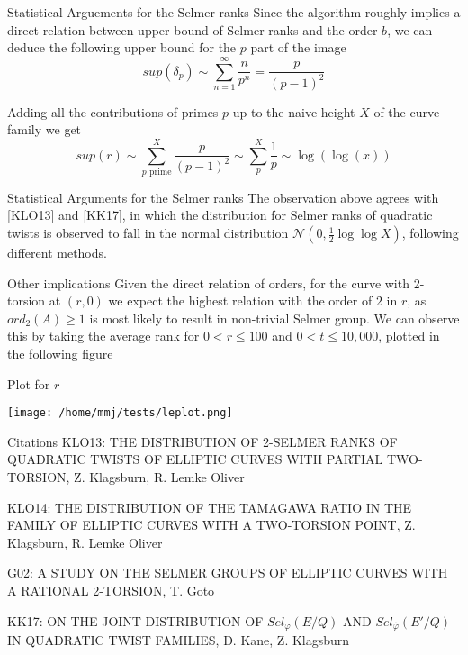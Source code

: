 \documentclass[presentation]{beamer}
\begin{document}
\begin{frame}[label={sec:org375f1cc}]{Statistical Arguements for the Selmer ranks}
Since the algorithm roughly implies a direct relation
between upper bound of Selmer ranks and the order \(b\), we can deduce the
following upper bound for the \(p\) part of the image
$$sup(\delta_p) \sim \sum_{n = 1}^\infty \frac{n}{p^{n}} = \frac{p}{(p-1)^2}$$

Adding all the contributions of primes \(p\) up to the naive height
\(X\) of the curve family we get
$$sup(r) \sim \sum_{p \text{ prime}}^X \frac{p}{(p-1)^2} \sim \sum_p^X \frac{1}{p} \sim \log(\log(x))$$
\end{frame}
\begin{frame}[label={sec:orge060821}]{Statistical Arguments for the Selmer ranks}
The observation above agrees with [KLO13] and [KK17], in which the distribution
for Selmer ranks of quadratic twists is observed to fall in the
normal distribution \(\mathscr{N}(0, \frac{1}{2}\log\log X)\), following different methods.
\end{frame}
\begin{frame}[label={sec:org4f83c18}]{Other implications}
Given the direct relation of orders, for the curve with 2-torsion
at \((r,0)\) we expect the highest relation with the order of \(2\) in \(r\),
as \(ord_2(A) \ge 1\) is most likely to result in non-trivial Selmer group.
We can observe this by taking the average rank for \(0<r \le 100\) and
\(0 < t \le 10,000\), plotted in the following figure
\end{frame}
\begin{frame}[label={sec:orga2044a4}]{Plot for \(r\)}
\begin{center}
\texttt{[image: /home/mmj/tests/leplot.png]}
\end{center}
\end{frame}
\begin{frame}[label={sec:orgf88e266}]{Citations}
KLO13: THE DISTRIBUTION OF 2-SELMER RANKS OF QUADRATIC TWISTS
OF ELLIPTIC CURVES WITH PARTIAL TWO-TORSION, Z. Klagsburn, R. Lemke Oliver

KLO14: THE DISTRIBUTION OF THE TAMAGAWA RATIO IN THE FAMILY
OF ELLIPTIC CURVES WITH A TWO-TORSION POINT, Z. Klagsburn, R. Lemke Oliver

G02: A STUDY ON THE SELMER GROUPS OF ELLIPTIC CURVES
WITH A RATIONAL 2-TORSION, T. Goto

KK17: ON THE JOINT DISTRIBUTION OF \(Sel_\varphi(E/Q)\) AND \(Sel_{\hat{\varphi}} (E′/Q)\) IN
QUADRATIC TWIST FAMILIES, D. Kane, Z. Klagsburn
\end{frame}
\end{document}
